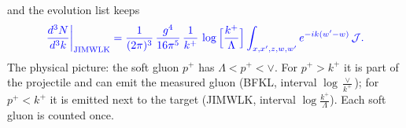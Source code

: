\documentclass[9pt]{article}
\newcommand{\new}[1]{{\color{blue}#1}}
\numberwithin{equation}{section}
\begin{document}
\new{and the evolution list keeps}
\begin{equation}
\new{\frac{d^3N}{d^3k}\bigg|_{\rm JIMWLK}=\frac{1}{(2\pi)^{3}}\,\frac{g^{4}}{16\pi^{5}}\,\frac{1}{k^{+}}\,\log\Big[\frac{k^{+}}{\Lambda}\Big]\int_{x,x',z,w,w'}e^{-ik(w'-w)}\,\mathcal J .}
\end{equation}
\new{The physical picture: the soft gluon $p^+$ has $\Lambda<p^+<\vee$. For $p^+>k^+$ it is part of the projectile and can emit the measured gluon (BFKL, interval $\log\frac{\vee}{k^+}$); for $p^+<k^+$ it is emitted next to the target (JIMWLK, interval $\log\frac{k^+}{\Lambda}$). Each soft gluon is counted once.}
\end{document}
